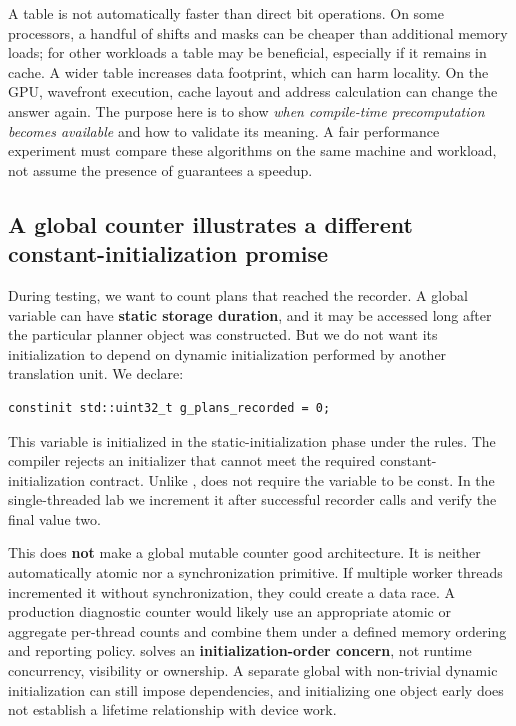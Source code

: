 A table is not automatically faster than direct bit operations. On some processors, a handful of shifts and masks can be cheaper than additional memory loads; for other workloads a table may be beneficial, especially if it remains in cache. A wider table increases data footprint, which can harm locality. On the GPU, wavefront execution, cache layout and address calculation can change the answer again. The purpose here is to show \emph{when compile-time precomputation becomes available} and how to validate its meaning. A fair performance experiment must compare these algorithms on the same machine and workload, not assume the presence of  guarantees a speedup.

\subsection{A global counter illustrates a different constant-initialization promise}\label{05-engine-i-ch005-a-global-counter-illustrates-a-different-constant-initialization-promise}

\hypertarget{05-engine-i-ch005-a-global-counter-illustrates-a-different-constant-initialization-promise}{}

During testing, we want to count plans that reached the recorder. A global variable can have \textbf{static storage duration}, and it may be accessed long after the particular planner object was constructed. But we do not want its initialization to depend on dynamic initialization performed by another translation unit. We declare:

\begin{verbatim}
constinit std::uint32_t g_plans_recorded = 0;
\end{verbatim}

This variable is initialized in the static-initialization phase under the  rules. The compiler rejects an initializer that cannot meet the required constant-initialization contract. Unlike ,  does not require the variable to be const. In the single-threaded lab we increment it after successful recorder calls and verify the final value two.

This does \textbf{not} make a global mutable counter good architecture. It is neither automatically atomic nor a synchronization primitive. If multiple worker threads incremented it without synchronization, they could create a data race. A production diagnostic counter would likely use an appropriate atomic or aggregate per-thread counts and combine them under a defined memory ordering and reporting policy.  solves an \textbf{initialization-order concern}, not runtime concurrency, visibility or ownership. A separate global with non-trivial dynamic initialization can still impose dependencies, and initializing one object early does not establish a lifetime relationship with device work.

